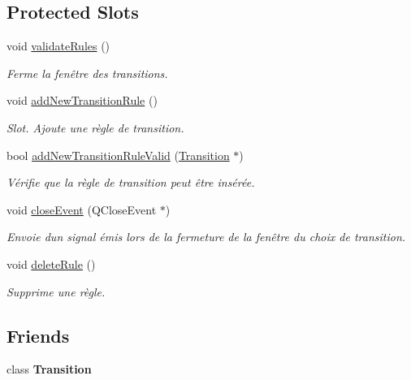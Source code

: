 \subsection*{Protected Slots}
\begin{DoxyCompactItemize}
\item 
void \mbox{\hyperlink{class_transition_interface_a3db0ae462c81b5251ce89759c52d8103}{validate\+Rules}} ()
\begin{DoxyCompactList}\small\item\em Ferme la fenêtre des transitions. \end{DoxyCompactList}\item 
\mbox{\label{class_transition_interface_a80af97e661c3a3e8786eada43a14b2f3}} 
void \mbox{\hyperlink{class_transition_interface_a80af97e661c3a3e8786eada43a14b2f3}{add\+New\+Transition\+Rule}} ()
\begin{DoxyCompactList}\small\item\em Slot. Ajoute une règle de transition. \end{DoxyCompactList}\item 
bool \mbox{\hyperlink{class_transition_interface_a34707c10737235a26a7cd818f9574109}{add\+New\+Transition\+Rule\+Valid}} (\mbox{\hyperlink{class_transition}{Transition}} $\ast$)
\begin{DoxyCompactList}\small\item\em Vérifie que la règle de transition peut être insérée. \end{DoxyCompactList}\item 
void \mbox{\hyperlink{class_transition_interface_a881a8911074ffa7c15b03958575fd331}{close\+Event}} (Q\+Close\+Event $\ast$)
\begin{DoxyCompactList}\small\item\em Envoie d\textquotesingle{}un signal émis lors de la fermeture de la fenêtre du choix de transition. \end{DoxyCompactList}\item 
void \mbox{\hyperlink{class_transition_interface_a36900078169dc2f7b37f8c89ea499fc0}{delete\+Rule}} ()
\begin{DoxyCompactList}\small\item\em Supprime une règle. \end{DoxyCompactList}\end{DoxyCompactItemize}
\subsection*{Friends}
\begin{DoxyCompactItemize}
\item 
\mbox{\label{class_transition_interface_a2960822a514fbdac7a15bd02ae7e645b}} 
class {\bfseries Transition}
\end{DoxyCompactItemize}


